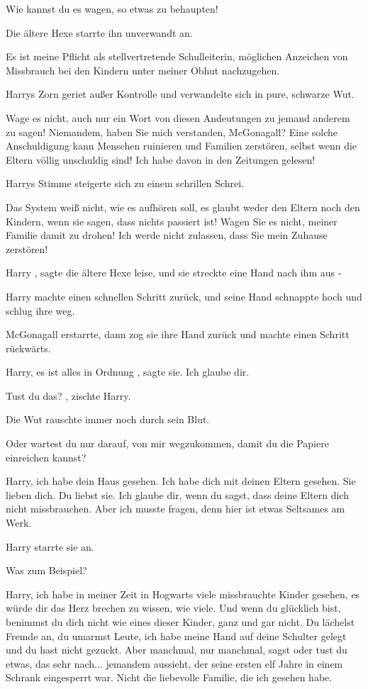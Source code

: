 Wie kannst du es wagen, so etwas zu behaupten!\grqq{}

Die ältere Hexe starrte ihn unverwandt an.

\glqq Es ist meine Pflicht als stellvertretende Schulleiterin, möglichen
Anzeichen von Missbrauch bei den Kindern unter meiner Obhut
nachzugehen.\grqq{}

Harrys Zorn geriet außer Kontrolle und verwandelte sich in pure, schwarze Wut.

\glqq Wage es nicht, auch nur ein Wort von diesen Andeutungen zu jemand anderem
zu sagen! Niemandem, haben Sie mich verstanden, McGonagall? Eine solche
Anschuldigung kann Menschen ruinieren und Familien zerstören, selbst wenn
die Eltern völlig unschuldig sind! Ich habe davon in den Zeitungen
gelesen!\grqq{}

Harrys Stimme steigerte sich zu einem schrillen Schrei.

\glqq Das System weiß nicht, wie es aufhören soll, es glaubt weder den Eltern
noch den Kindern, wenn sie sagen, dass nichts passiert ist! Wagen Sie es
nicht, meiner Familie damit zu drohen! Ich werde nicht zulassen, dass Sie
mein Zuhause zerstören!\grqq{}

\glqq Harry\grqq{} , sagte die ältere Hexe leise, und sie streckte eine Hand
nach ihm aus -

Harry machte einen schnellen Schritt zurück, und seine Hand schnappte hoch und
schlug ihre weg.

McGonagall erstarrte, dann zog sie ihre Hand zurück und machte einen Schritt
rückwärts.

\glqq Harry, es ist alles in Ordnung\grqq{} , sagte sie. \glqq Ich glaube
dir.\grqq{}

\glqq Tust du das?\grqq{} , zischte Harry.

Die Wut rauschte immer noch durch sein Blut.

\glqq Oder wartest du nur darauf, von mir wegzukommen, damit du die Papiere
einreichen kannst?\grqq{}

\glqq Harry, ich habe dein Haus gesehen. Ich habe dich mit deinen Eltern
gesehen. Sie lieben dich. Du liebst sie. Ich glaube dir, wenn du sagst, dass
deine Eltern dich nicht missbrauchen. Aber ich musste fragen, denn hier ist
etwas Seltsames am Werk.\grqq{}

Harry starrte sie an.

\glqq Was zum Beispiel?\grqq{}

\glqq Harry, ich habe in meiner Zeit in Hogwarts viele missbrauchte Kinder
gesehen, es würde dir das Herz brechen zu wissen, wie viele. Und wenn du
glücklich bist, benimmst du dich nicht wie eines dieser Kinder, ganz und gar
nicht. Du lächelst Fremde an, du umarmst Leute, ich habe meine Hand auf
deine Schulter gelegt und du hast nicht gezuckt. Aber manchmal, nur
manchmal, sagst oder tust du etwas, das sehr nach... jemandem aussieht, der
seine ersten elf Jahre in einem Schrank eingesperrt war. Nicht die
liebevolle Familie, die ich gesehen habe.\grqq{}

